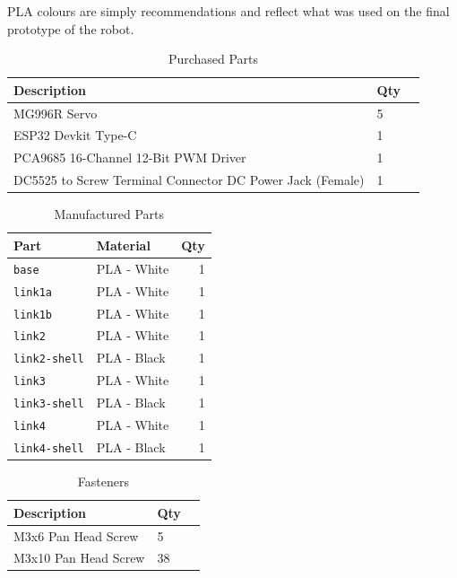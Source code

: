 \documentclass[a4paper,11pt]{article}
\begin{document}
PLA colours are simply recommendations and reflect what was used on the final prototype of the robot.

\begin{table}[H]
    \centering
    \caption{Purchased Parts}
    \label{tab:bom_pp}
    \begin{tabularx}{\textwidth}{@{} l X r @{}}
        \toprule
        \textbf{Description} & \textbf{Qty} \\
        \midrule
        MG996R Servo                                              & 5 \\
        ESP32 Devkit Type-C                                       & 1 \\
        PCA9685 16-Channel 12-Bit PWM Driver                      & 1 \\
        DC5525 to Screw Terminal Connector DC Power Jack (Female) & 1 \\
        \bottomrule
    \end{tabularx}
\end{table}

\begin{table}[H]
    \centering
    \caption{Manufactured Parts}
    \label{tab:bom_manufactured}
    \begin{tabularx}{\textwidth}{@{} l X r @{}}
        \toprule
        \textbf{Part} & \textbf{Material} & \textbf{Qty} \\
        \midrule
        \texttt{base}                    & PLA - White & 1 \\
        \texttt{link1a}                  & PLA - White & 1 \\
        \texttt{link1b}                  & PLA - White & 1 \\
        \texttt{link2}                   & PLA - White & 1 \\
        \texttt{link2-shell}             & PLA - Black & 1 \\
        \texttt{link3}                   & PLA - White & 1 \\
        \texttt{link3-shell}             & PLA - Black & 1 \\
        \texttt{link4}                   & PLA - White & 1 \\
        \texttt{link4-shell}             & PLA - Black & 1 \\
        \bottomrule
    \end{tabularx}
\end{table}

\begin{table}[H]
    \centering
    \caption{Fasteners}
    \label{tab:bom_fasteners}
    \begin{tabularx}{\textwidth}{@{} l X r @{}}
        \toprule
        \textbf{Description} & \textbf{Qty} \\
        \midrule
        M3x6 Pan Head Screw  & 5  \\
        M3x10 Pan Head Screw & 38 \\
        \bottomrule
    \end{tabularx}
\end{table}
\end{document}

